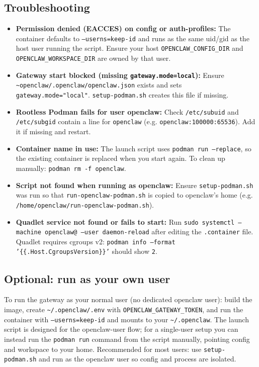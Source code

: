 \subsection{Troubleshooting}


\begin{itemize}
  \item \textbf{Permission denied (EACCES) on config or auth-profiles:} The container defaults to \texttt{--userns=keep-id} and runs as the same uid/gid as the host user running the script. Ensure your host \texttt{OPENCLAW\_CONFIG\_DIR} and \texttt{OPENCLAW\_WORKSPACE\_DIR} are owned by that user.
  \item \textbf{Gateway start blocked (missing \texttt{gateway.mode=local}):} Ensure \texttt{\textasciitilde{}openclaw/.openclaw/openclaw.json} exists and sets \texttt{gateway.mode="local"}. \texttt{setup-podman.sh} creates this file if missing.
  \item \textbf{Rootless Podman fails for user openclaw:} Check \texttt{/etc/subuid} and \texttt{/etc/subgid} contain a line for \texttt{openclaw} (e.g. \texttt{openclaw:100000:65536}). Add it if missing and restart.
  \item \textbf{Container name in use:} The launch script uses \texttt{podman run --replace}, so the existing container is replaced when you start again. To clean up manually: \texttt{podman rm -f openclaw}.
  \item \textbf{Script not found when running as openclaw:} Ensure \texttt{setup-podman.sh} was run so that \texttt{run-openclaw-podman.sh} is copied to openclaw’s home (e.g. \texttt{/home/openclaw/run-openclaw-podman.sh}).
  \item \textbf{Quadlet service not found or fails to start:} Run \texttt{sudo systemctl --machine openclaw@ --user daemon-reload} after editing the \texttt{.container} file. Quadlet requires cgroups v2: \texttt{podman info --format '\{\{.Host.CgroupsVersion\}\}'} should show \texttt{2}.
\end{itemize}


\subsection{Optional: run as your own user}


To run the gateway as your normal user (no dedicated openclaw user): build the image, create \texttt{\textasciitilde{}/.openclaw/.env} with \texttt{OPENCLAW\_GATEWAY\_TOKEN}, and run the container with \texttt{--userns=keep-id} and mounts to your \texttt{\textasciitilde{}/.openclaw}. The launch script is designed for the openclaw-user flow; for a single-user setup you can instead run the \texttt{podman run} command from the script manually, pointing config and workspace to your home. Recommended for most users: use \texttt{setup-podman.sh} and run as the openclaw user so config and process are isolated.


\clearpage

